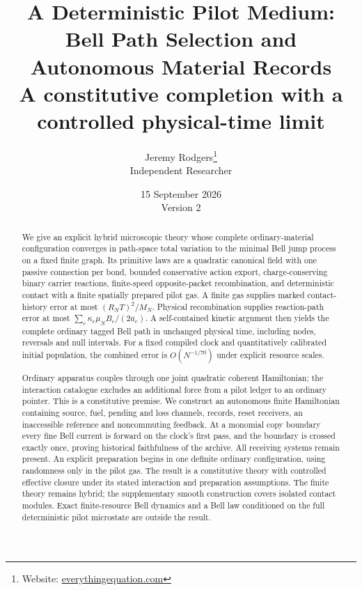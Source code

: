 \documentclass[11pt]{article}
\title{%
  \bfseries A Deterministic Pilot Medium:\\
  Bell Path Selection and Autonomous Material Records\\[6mm]
  {\large A constitutive completion with a controlled physical-time limit}
}
\author{%
  Jeremy Rodgers\thanks{Website:
  \href{https://everythingequation.com}{everythingequation.com}}\\
  \small Independent Researcher
}
\date{%
  15 September 2026\\[2mm]
  \small Version 2
}
\theoremstyle{definition}\newtheorem{definition}[theorem]{Definition}
\theoremstyle{remark}\newtheorem{remark}[theorem]{Remark}
\begin{document}
\maketitle
\begin{abstract}
We give an explicit hybrid microscopic theory whose complete ordinary-material configuration converges in path-space total variation to the minimal Bell jump process on a fixed finite graph. Its primitive laws are a quadratic canonical field with one passive connection per bond, bounded conservative action export, charge-conserving binary carrier reactions, finite-speed opposite-packet recombination, and deterministic contact with a finite spatially prepared pilot gas. A finite gas supplies marked contact-history error at most $(R_NT)^2/M_N$. Physical recombination supplies reaction-path error at most $\sum_e\kappa_e\mu_N B_e/(2a_e)$. A self-contained kinetic argument then yields the complete ordinary tagged Bell path in unchanged physical time, including nodes, reversals and null intervals. For a fixed compiled clock and quantitatively calibrated initial population, the combined error is $O(N^{-1/70})$ under explicit resource scales.

Ordinary apparatus couples through one joint quadratic coherent Hamiltonian; the interaction catalogue excludes an additional force from a pilot ledger to an ordinary pointer. This is a constitutive premise. We construct an autonomous finite Hamiltonian containing source, fuel, pending and loss channels, records, reset receivers, an inaccessible reference and noncommuting feedback. At a monomial copy boundary every fine Bell current is forward on the clock's first pass, and the boundary is crossed exactly once, proving historical faithfulness of the archive. All receiving systems remain present. An explicit preparation begins in one definite ordinary configuration, using randomness only in the pilot gas. The result is a constitutive theory with controlled effective closure under its stated interaction and preparation assumptions. The finite theory remains hybrid; the supplementary smooth construction covers isolated contact modules. Exact finite-resource Bell dynamics and a Bell law conditioned on the full deterministic pilot microstate are outside the result.
\end{abstract}
\tableofcontents
\end{document}
